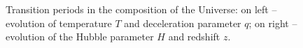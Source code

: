 \begin{figure}
\begin{minipage}{\linewidth}
\caption{Transition periods in the composition of the Universe: on left -- evolution of temperature $T$ and deceleration parameter $q$; on right -- evolution of the Hubble parameter $H$ and redshift $z$.
\label{fig:today} }
\end{minipage}
\end{figure}

